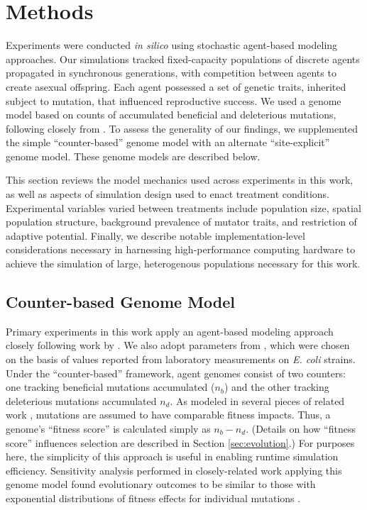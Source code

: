\section{Methods} \label{sec:methods}

Experiments were conducted \textit{in silico} using stochastic agent-based modeling approaches.
Our simulations tracked fixed-capacity populations of discrete agents propagated in synchronous generations, with competition between agents to create asexual offspring.
Each agent possessed a set of genetic traits, inherited subject to mutation, that influenced reproductive success.
We used a genome model based on counts of accumulated beneficial and deleterious mutations, following closely from \citep{raynes2018sign}.
To assess the generality of our findings, we supplemented the simple ``counter-based'' genome model with an alternate ``site-explicit'' genome model.
These genome models are described below.

This section reviews the model mechanics used across experiments in this work, as well as aspects of simulation design used to enact treatment conditions.
Experimental variables varied between treatments include population size, spatial population structure, background prevalence of mutator traits, and restriction of adaptive potential.
Finally, we describe notable implementation-level considerations necessary in harnessing high-performance computing hardware to achieve the simulation of large, heterogenous populations necessary for this work.

\subsection{Counter-based Genome Model} \label{sec:poisson}

Primary experiments in this work apply an agent-based modeling approach closely following work by \citet{raynes2018sign}.
We also adopt parameters from \citet{raynes2018sign}, which were chosen on the basis of values reported from laboratory measurements on \textit{E. coli} strains\citep{wloch2001direct,frenkel2014fates,joseph2004spontaneous,levy2015quantitative,zeyl2001estimates}.
Under the ``counter-based'' framework, agent genomes consist of two counters: one tracking beneficial mutations accumulated ($n_b$) and the other tracking deleterious mutations accumulated $n_d$.
As modeled in several pieces of related work \citep{tenaillon1999mutators,travis2002mutator,raynes2019migration,tanaka2003evolution,wylie2009fixation}, mutations are assumed to have comparable fitness impacts.
Thus, a genome’s ``fitness score'' is calculated simply as $n_b - n_d$.
(Details on how ``fitness score'' influences selection are described in Section \ref{sec:evolution}.)
For purposes here, the simplicity of this approach is useful in enabling runtime simulation efficiency.
Sensitivity analysis performed in closely-related work applying this genome model found evolutionary outcomes to be similar to those with exponential distributions of fitness effects for individual mutations \citep{raynes2019selection}.

